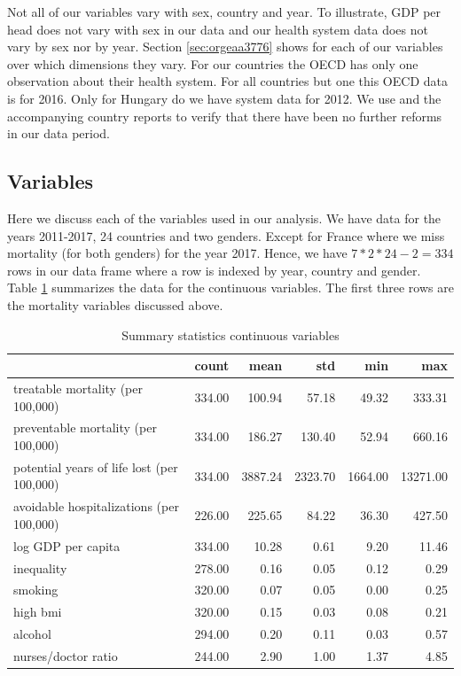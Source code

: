 \documentclass[a4paper,12pt]{article}
\begin{document}
Not all of our variables vary with sex, country and year. To illustrate, GDP per head does not vary with sex in our data and our health system data does not vary by sex nor by year. Section \ref{sec:orgeaa3776} shows for each of our variables over which dimensions they vary. For our countries the OECD has only one observation about their health system. For all countries but one this OECD data is for 2016. Only for Hungary do we have system data for 2012. We use \cite{countryprofileReport} and the accompanying country reports to verify that there have been no further reforms in our data period.


\subsection{Variables}
\label{sec:orgd005470}

Here we discuss each of the variables used in our analysis. We have data for the years 2011-2017, 24 countries and two genders. Except for France where we miss mortality (for both genders) for the year 2017. Hence, we have \(7*2*24-2=334\) rows in our data frame where a row is indexed by year, country and gender. Table \ref{tab:summary_variables} summarizes the data for the continuous variables. The first three rows are the mortality variables discussed above.

\begin{table}[htbp]
\caption{\label{tab:summary_variables}Summary statistics continuous variables}
\centering
\begin{tabular}{lrrrrr}
 & count & mean & std & min & max\\
\hline
treatable mortality (per 100,000) & 334.00 & 100.94 & 57.18 & 49.32 & 333.31\\
preventable mortality (per 100,000) & 334.00 & 186.27 & 130.40 & 52.94 & 660.16\\
potential years of life lost (per 100,000) & 334.00 & 3887.24 & 2323.70 & 1664.00 & 13271.00\\
avoidable hospitalizations (per 100,000) & 226.00 & 225.65 & 84.22 & 36.30 & 427.50\\
log GDP per capita & 334.00 & 10.28 & 0.61 & 9.20 & 11.46\\
inequality & 278.00 & 0.16 & 0.05 & 0.12 & 0.29\\
smoking & 320.00 & 0.07 & 0.05 & 0.00 & 0.25\\
high bmi & 320.00 & 0.15 & 0.03 & 0.08 & 0.21\\
alcohol & 294.00 & 0.20 & 0.11 & 0.03 & 0.57\\
nurses/doctor ratio & 244.00 & 2.90 & 1.00 & 1.37 & 4.85\\
\end{tabular}
\end{table}
\end{document}
